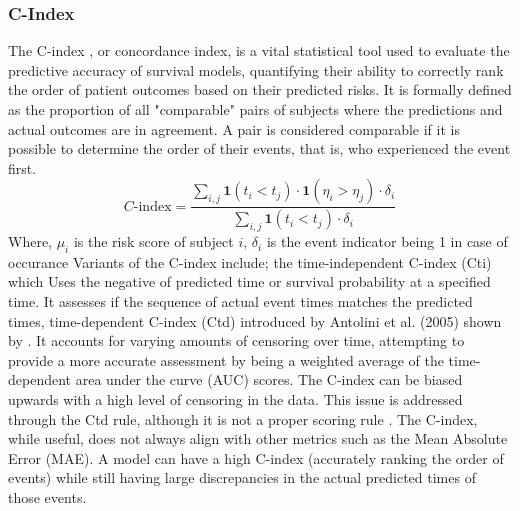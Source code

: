 \subsubsection{C-Index}
\noindent The C-index \parencite{qi_effective_2023}, or concordance index, is a vital statistical tool used to evaluate the predictive accuracy of survival models, quantifying their ability to correctly rank the order of patient outcomes based on their predicted risks. It is formally defined as the proportion of all "comparable" pairs of subjects where the predictions and actual outcomes are in agreement. A pair is considered comparable if it is possible to determine the order of their events, that is, who experienced the event first.
\begin{equation} \label{eq:cindex}C\text{-index} = \frac{\sum_{i,j} \mathbf{1}(t_i < t_j) \cdot \mathbf{1}(\eta_i > \eta_j) \cdot \delta_i}{\sum_{i,j} \mathbf{1}(t_i < t_j) \cdot \delta_i}\end{equation}
\noindent Where, \(\mu_{i}\) is the risk score of subject \(i\), \(\delta_{i}\) is the event indicator being 1 in case of occurance
\noindent Variants of the C-index include; the time-independent C-index (Cti) which Uses the negative of predicted time or survival probability at a specified time. It assesses if the sequence of actual event times matches the predicted times, time-dependent C-index (Ctd) introduced by Antolini et al. (2005) shown by \parencite{qi_effective_2023}. It accounts for varying amounts of censoring over time, attempting to provide a more accurate assessment by being a weighted average of the time-dependent area under the curve (AUC) scores. The C-index can be biased upwards with a high level of censoring in the data. This issue is addressed through the Ctd rule, although it is not a proper scoring rule \parencite{qi_effective_2023}. The C-index, while useful, does not always align with other metrics such as the Mean Absolute Error (MAE). A model can have a high C-index (accurately ranking the order of events) while still having large discrepancies in the actual predicted times of those events.

